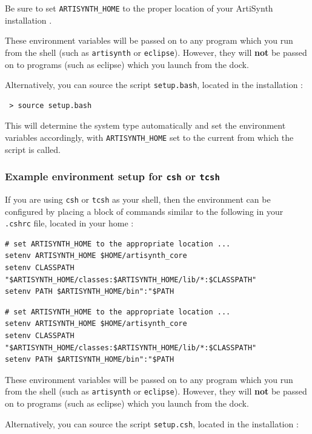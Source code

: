 Be sure to set {\tt ARTISYNTH\_HOME} to the proper location of your
ArtiSynth installation \directory{}.

These environment variables will be passed on to any program which you
run from the shell (such as {\tt artisynth} or {\tt eclipse}).
\ifMacOS
However, they will {\bf not} be passed on to programs (such as eclipse)
which you launch from the dock.
\fi

Alternatively, you can source the script {\tt setup.bash}, located in
the installation \directory{}:

\begin{verbatim}
 > source setup.bash
\end{verbatim}

This will determine the system type automatically and set the
environment variables accordingly, with {\tt ARTISYNTH\_HOME} set to the
current \directory{} from which the script is called.

\subsubsection{Example environment setup for {\tt csh} or {\tt tcsh}}
\label{CshEnvironmentSetup}

If you are using {\tt csh} or {\tt tcsh} as your shell, then the
environment can be configured by placing a block of commands similar
to the following in your {\tt .cshrc} file, located in your home
\directory{}:

\ifLinux
\begin{lstlisting}[]
# set ARTISYNTH_HOME to the appropriate location ...
setenv ARTISYNTH_HOME $HOME/artisynth_core
setenv CLASSPATH "$ARTISYNTH_HOME/classes:$ARTISYNTH_HOME/lib/*:$CLASSPATH"
setenv PATH $ARTISYNTH_HOME/bin":"$PATH
\end{lstlisting}
\else\ifMacOS
\begin{lstlisting}[]
# set ARTISYNTH_HOME to the appropriate location ...
setenv ARTISYNTH_HOME $HOME/artisynth_core
setenv CLASSPATH "$ARTISYNTH_HOME/classes:$ARTISYNTH_HOME/lib/*:$CLASSPATH"
setenv PATH $ARTISYNTH_HOME/bin":"$PATH
\end{lstlisting}
\fi %
\fi %

These environment variables will be passed on to any program which you
run from the shell (such as {\tt artisynth} or {\tt eclipse}).
\ifMacOS
However, they will {\bf not} be passed on to programs (such as eclipse)
which you launch from the dock.
\fi

Alternatively, you can source the script {\tt setup.csh}, located in
the installation \directory{}:


